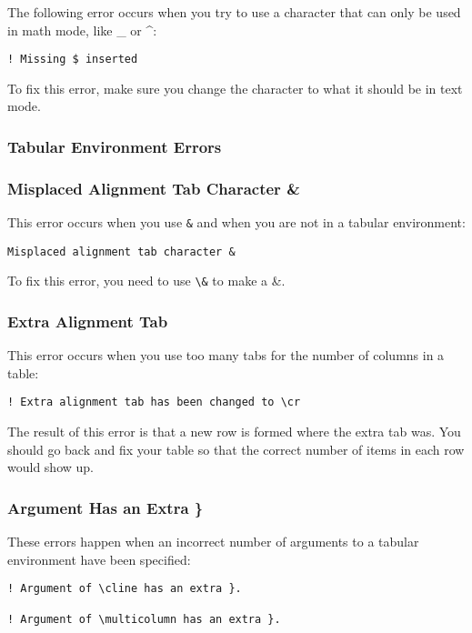 The following error occurs when you try to use a character that can
only be used in math mode, like \_ or \^{}:
\begin{verbatim}
! Missing $ inserted
\end{verbatim}

To fix this error, make sure you change the character to what it
should be in text mode.

\subsubsection{Tabular Environment Errors}
\label{sec:tabul-envir-errors}

\subsubsection{Misplaced Alignment Tab Character \&}
\label{sec:mispl-alignm-tab}

This error occurs when you use \texttt{\&} and when you are not in a
tabular environment:
\begin{verbatim}
Misplaced alignment tab character &
\end{verbatim}

To fix this error, you need to use \verb|\&| to make a \&.

\subsubsection{Extra Alignment Tab}
\label{sec:extra-alignment-tab}

This error occurs when you use too many tabs for the number of columns
in a table:
\begin{verbatim}
! Extra alignment tab has been changed to \cr
\end{verbatim}

The result of this error is that a new row is formed where the extra
tab was.  You should go back and fix your table so that the correct
number of items in each row would show up.

\subsubsection{Argument Has an Extra \}}
\label{sec:argument-has-an}

These errors happen when an incorrect number of arguments to a tabular
environment have been specified:
\begin{verbatim}
! Argument of \cline has an extra }.

! Argument of \multicolumn has an extra }.
\end{verbatim}

